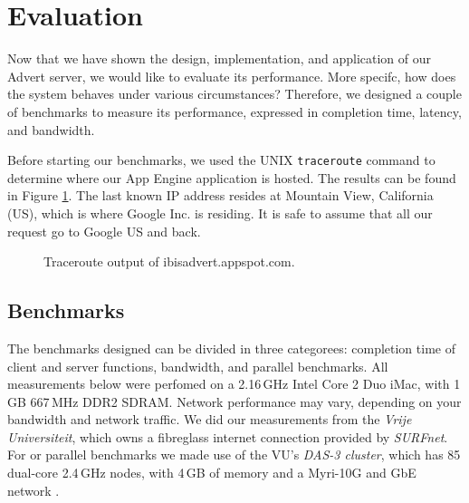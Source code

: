 \section{Evaluation}
\label{evaluation}
Now that we have shown the design, implementation, and application of our Advert
server, we would like to evaluate its performance. More specifc, how does the
system behaves under various circumstances? Therefore, we designed a couple of
benchmarks to measure its performance, expressed in completion time, latency,
and bandwidth.

Before starting our benchmarks, we used the UNIX \texttt{traceroute} command to
determine where our App Engine application is hosted. The results can be found in
Figure \ref{tracert}. The last known IP address resides at Mountain View,
California (US), which is where Google Inc. is residing. It is safe to assume
that all our request go to Google US and back.

\begin{figure} %
\begin{center}
\caption{Traceroute output of ibisadvert.appspot.com.\label{tracert}}
\end{center}
\end{figure}

\subsection{Benchmarks}
The benchmarks designed can be divided in three categorees: completion time of
client and server functions, bandwidth, and parallel benchmarks. All measurements
below were perfomed on a 2.16\,GHz Intel Core 2 Duo iMac, with 1\,GB 667\,MHz
DDR2 SDRAM. Network performance may vary, depending on your bandwidth and network
traffic. We did our measurements from the \emph{Vrije Universiteit}, which owns a
fibreglass internet connection provided by \emph{SURFnet}. For or parallel
benchmarks we made use of the VU's \emph{DAS-3 cluster}, which has 85 dual-core
2.4\,GHz nodes, with 4\,GB of memory and a Myri-10G and GbE network \cite{das3-www}.

